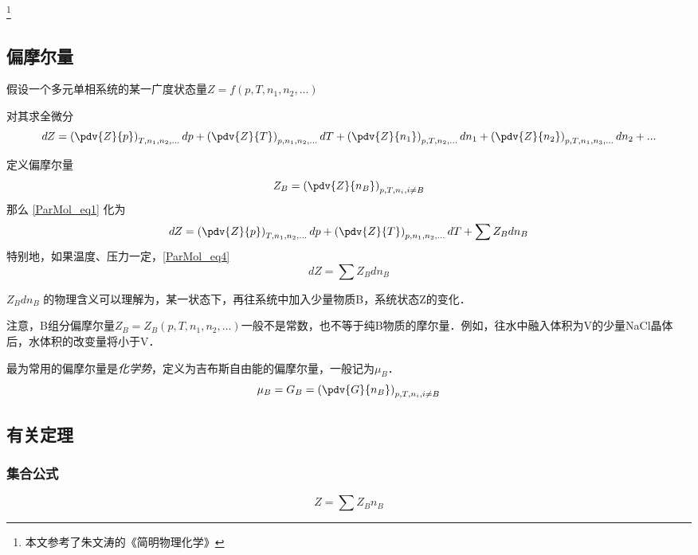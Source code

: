 \footnote{本文参考了朱文涛的《简明物理化学》}

\subsection{偏摩尔量}
假设一个多元单相系统的某一广度状态量$Z=f(p,T,n_1,n_2,...)$

对其求全微分
\begin{equation}\label{ParMol_eq1}
dZ = \left(\pdv{Z}{p}\right)_{T,n_1,n_2,...}dp + \left(\pdv{Z}{T}\right)_{p,n_1,n_2,...}dT+\left(\pdv{Z}{n_1}\right)_{p,T,n_2,...}dn_1+\left(\pdv{Z}{n_2}\right)_{p,T,n_1,n_3,...}dn_2+...
\end{equation}

定义偏摩尔量
\begin{equation}
{Z_B} = \left(\pdv{Z}{n_B}\right)_{p,T,n_i, i \neq B} 
\end{equation}
那么 \autoref{ParMol_eq1} 化为 
\begin{equation}\label{ParMol_eq4}
dZ = \left(\pdv{Z}{p}\right)_{T,n_1,n_2,...}dp + \left(\pdv{Z}{T}\right)_{p,n_1,n_2,...}dT+\sum {Z_B} dn_B
\end{equation}
特别地，如果温度、压力一定，\autoref{ParMol_eq4} 
\begin{equation}\label{ParMol_eq3}
dZ = \sum {Z_B} dn_B
\end{equation}

${Z_B} d n_B$ 的物理含义可以理解为，某一状态下，再往系统中加入少量物质B，系统状态Z的变化．

注意，B组分偏摩尔量${Z_B}={Z_B}(p,T,n_1,n_2,...)$一般不是常数，也不等于纯B物质的摩尔量．例如，往水中融入体积为V的少量NaCl晶体后，水体积的改变量将小于V．

最为常用的偏摩尔量是\textsl{化学势}，定义为吉布斯自由能的偏摩尔量，一般记为$\mu_B$．
\begin{equation}
\mu_B={G_B} = \left(\pdv{G}{n_B}\right)_{p,T,n_i, i \neq B} 
\end{equation}

\subsection{有关定理}
\subsubsection{集合公式}
\begin{equation}\label{ParMol_eq2}
Z=\sum {Z_B}  n_B
\end{equation}

